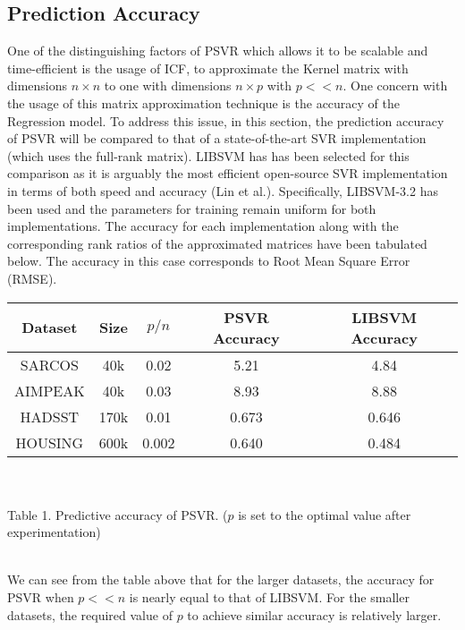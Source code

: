 \documentclass[12pt]{article}
\begin{document}
\subsection{Prediction Accuracy}
\label{Prediction Accuracy}
One of the distinguishing factors of PSVR which allows it to be scalable and time-efficient is the usage of ICF, to approximate the Kernel matrix with dimensions $n \times n$ to one with dimensions $n \times p$ with $p << n$. One concern with the usage of this matrix approximation technique is the accuracy of the Regression model. To address this issue, in this section, the prediction accuracy of PSVR will be compared to that of a state-of-the-art SVR implementation (which uses the full-rank matrix).
\newline
LIBSVM has has been selected for this comparison as it is arguably the most efficient open-source SVR implementation in terms of both speed and accuracy (Lin et al.). Specifically, LIBSVM-3.2 has been used and the parameters for training remain uniform for both implementations.
\newline
The accuracy for each implementation along with the corresponding rank ratios of the approximated matrices have been tabulated below. 
The accuracy in this case corresponds to Root Mean Square Error (RMSE).
\begin{center}
\begin{tabular}{ |c|c|c|c|c| }
  \hline
  Dataset & Size & $p/n$ & PSVR Accuracy & LIBSVM Accuracy \\
  \hline
  SARCOS & 40k& 0.02& 5.21 & 4.84 \\
  AIMPEAK & 40k & 0.03 & 8.93 & 8.88 \\
  HADSST & 170k & 0.01 & 0.673 &0.646 \\
  HOUSING & 600k & 0.002 & 0.640 & 0.484 \\
  \hline
\end{tabular}
\ \\
\ \\
Table 1. Predictive accuracy of PSVR. ($p$ is set to the optimal value  after experimentation)
\end{center}
\ \\
We can see from the table above that for the larger datasets, the accuracy for PSVR when $ p << n$ is nearly equal to that of LIBSVM. For the smaller datasets, the required value of $p$ to achieve similar accuracy is relatively larger.
\end{document}
